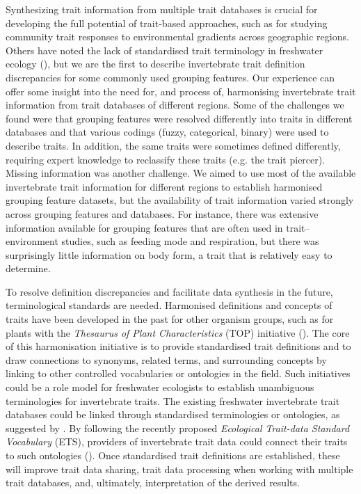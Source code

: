 \documentclass{article}
\begin{document}
Synthesizing trait information from multiple trait databases is crucial for developing the full potential of trait-based approaches, such as for studying community trait responses to environmental gradients across geographic regions. Others have noted the lack of standardised trait terminology in freshwater ecology (\cite{baird_toward_2011, brink_traits-based_2011}), but we are the first to describe invertebrate trait definition discrepancies for some commonly used grouping features. Our experience can offer some insight into the need for, and process of, harmonising invertebrate trait information from trait databases of different regions. Some of the challenges we found were that grouping features were resolved differently into traits in different databases and that various codings (fuzzy, categorical, binary) were used to describe traits. In addition, the same traits were sometimes defined differently, requiring expert knowledge to reclassify these traits (e.g. the trait piercer). Missing information was another challenge. We aimed to use most of the available invertebrate trait information for different regions to establish harmonised grouping feature datasets, but the availability of trait information varied strongly across grouping features and databases. For instance, there was extensive information available for grouping features that are often used in trait–environment studies, such as feeding mode and respiration, but there was surprisingly little information on body form, a trait that is relatively easy to determine.

To resolve definition discrepancies and facilitate data synthesis in the future, terminological standards are needed. Harmonised definitions and concepts of traits have been developed in the past for other organism groups, such as for plants with the \textit{Thesaurus of Plant Characteristics} (TOP) initiative (\cite{garnier_towards_2017}). The core of this harmonisation initiative is to provide standardised trait definitions and to draw connections to synonyms, related terms, and surrounding concepts by linking to other controlled vocabularies or ontologies in the field. Such initiatives could be a role model for freshwater ecologists to establish unambiguous terminologies for invertebrate traits. The existing freshwater invertebrate trait databases could be linked through standardised terminologies or ontologies, as suggested by \citet{baird_toward_2011}. By following the recently proposed \textit{Ecological Trait-data Standard Vocabulary} (ETS), providers of invertebrate trait data could connect their traits to such ontologies (\cite{schneider_towards_2019}). Once standardised trait definitions are established, these will improve trait data sharing, trait data processing when working with multiple trait databases, and, ultimately, interpretation of the derived results. 
\end{document}
